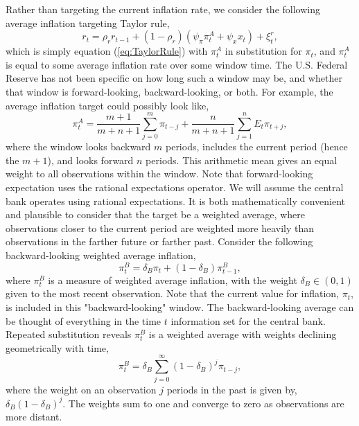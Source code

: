 \documentclass[12pt]{article}
\begin{document}
Rather than targeting the current inflation rate, we consider the following average inflation targeting Taylor rule,
\begin{equation}\label{eq:TaylorRuleAIT}
  r_t = \rho_r r_{t-1} + (1-\rho_r) \left( \psi_\pi \pi_t^A + \psi_x x_t \right) + \xi_t^{r},
\end{equation}
which is simply equation (\ref{eq:TaylorRule}) with $\pi_t^A$ in substitution for $\pi_t$, and $\pi_t^A$ is equal to some average inflation rate over some window time. The U.S. Federal Reserve has not been specific on how long such a window may be, and whether that window is forward-looking, backward-looking, or both. For example, the average inflation target could possibly look like,
\begin{equation}\label{eq:ait}
  \pi_t^A = \frac{m+1}{m+n+1}\sum_{j=0}^{m} \pi_{t-j} + \frac{n}{m+n+1}\sum_{j=1}^{n} E_t \pi_{t+j},
\end{equation}
where the window looks backward $m$ periods, includes the current period (hence the $m+1$), and looks forward $n$ periods.  This arithmetic mean gives an equal weight to all observations within the window. Note that forward-looking expectation uses the rational expectations operator. We will assume the central bank operates using rational expectations. It is both mathematically convenient and plausible to consider that the target be a weighted average, where observations closer to the current period are weighted more heavily than observations in the farther future or farther past. Consider the following backward-looking weighted average inflation,
\begin{equation}\label{eq:backward}
  \pi_t^B = \delta_B \pi_t + (1-\delta_B) \pi_{t-1}^B,
\end{equation}
where $\pi_t^B$ is a measure of weighted average inflation, with the weight $\delta_B \in (0,1)$ given to the most recent observation. Note that the current value for inflation, $\pi_t$, is included in this "backward-looking" window. The backward-looking average can be thought of everything in the time $t$ information set for the central bank. Repeated substitution reveals $\pi_t^B$ is a weighted average with weights declining geometrically with time,
\begin{equation}\label{eq:backward_all}
  \pi_t^B = \delta_B \sum_{j=0}^{\infty} (1-\delta_B)^j \pi_{t-j},
\end{equation}
where the weight on an observation $j$ periods in the past is given by, $\delta_B (1-\delta_B)^j$. The weights sum to one and converge to zero as observations are more distant.
\end{document}
